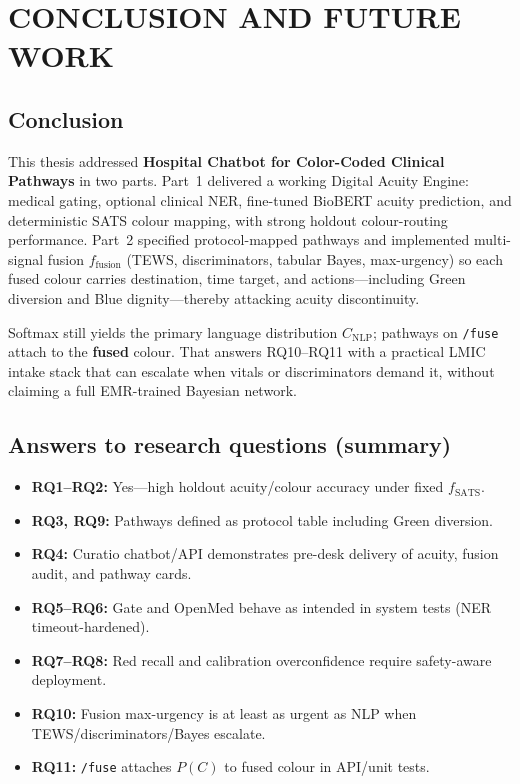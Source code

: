 \chapter{CONCLUSION AND FUTURE WORK}
\label{ch:conclusion}

\section{Conclusion}

This thesis addressed \textbf{Hospital Chatbot for Color-Coded Clinical Pathways} in two parts. Part~1 delivered a working Digital Acuity Engine: medical gating, optional clinical NER, fine-tuned BioBERT acuity prediction, and deterministic SATS colour mapping, with strong holdout colour-routing performance. Part~2 specified protocol-mapped pathways and implemented multi-signal fusion \(f_{\mathrm{fusion}}\) (TEWS, discriminators, tabular Bayes, max-urgency) so each fused colour carries destination, time target, and actions---including Green diversion and Blue dignity---thereby attacking acuity discontinuity.

Softmax still yields the primary language distribution \(C_{\mathrm{NLP}}\); pathways on \texttt{/fuse} attach to the \textbf{fused} colour. That answers RQ10--RQ11 with a practical LMIC intake stack that can escalate when vitals or discriminators demand it, without claiming a full EMR-trained Bayesian network.

\section{Answers to research questions (summary)}

\begin{itemize}
  \item \textbf{RQ1--RQ2:} Yes---high holdout acuity/colour accuracy under fixed \(f_{\mathrm{SATS}}\).
  \item \textbf{RQ3, RQ9:} Pathways defined as protocol table including Green diversion.
  \item \textbf{RQ4:} Curatio chatbot/API demonstrates pre-desk delivery of acuity, fusion audit, and pathway cards.
  \item \textbf{RQ5--RQ6:} Gate and OpenMed behave as intended in system tests (NER timeout-hardened).
  \item \textbf{RQ7--RQ8:} Red recall and calibration overconfidence require safety-aware deployment.
  \item \textbf{RQ10:} Fusion max-urgency is at least as urgent as NLP when TEWS/discriminators/Bayes escalate.
  \item \textbf{RQ11:} \texttt{/fuse} attaches \(P(C)\) to fused colour in API/unit tests.
\end{itemize}

